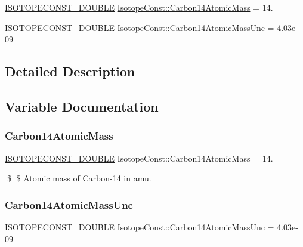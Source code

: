 \begin{DoxyCompactItemize}
\item 
\mbox{\hyperlink{group___isotope_const-_macros_ga8f45a7272ce02c0b4c65c44636ed719a}{I\+S\+O\+T\+O\+P\+E\+C\+O\+N\+S\+T\+\_\+\+D\+O\+U\+B\+LE}} \mbox{\hyperlink{group___isotope_const-_carbon-_c14_ga07f4e550d1315298e91e731909bc37a2}{Isotope\+Const\+::\+Carbon14\+Atomic\+Mass}} = 14.
\item 
\mbox{\hyperlink{group___isotope_const-_macros_ga8f45a7272ce02c0b4c65c44636ed719a}{I\+S\+O\+T\+O\+P\+E\+C\+O\+N\+S\+T\+\_\+\+D\+O\+U\+B\+LE}} \mbox{\hyperlink{group___isotope_const-_carbon-_c14_gacda1a323d85bf263790004e99669d3fc}{Isotope\+Const\+::\+Carbon14\+Atomic\+Mass\+Unc}} = 4.\+03e-\/09
\end{DoxyCompactItemize}


\subsection{Detailed Description}


\subsection{Variable Documentation}
\mbox{\label{group___isotope_const-_carbon-_c14_ga07f4e550d1315298e91e731909bc37a2}} 
\subsubsection{\texorpdfstring{Carbon14\+Atomic\+Mass}{Carbon14AtomicMass}}
{\footnotesize\ttfamily \mbox{\hyperlink{group___isotope_const-_macros_ga8f45a7272ce02c0b4c65c44636ed719a}{I\+S\+O\+T\+O\+P\+E\+C\+O\+N\+S\+T\+\_\+\+D\+O\+U\+B\+LE}} Isotope\+Const\+::\+Carbon14\+Atomic\+Mass = 14.}

\$ \$ Atomic mass of Carbon-\/14 in amu. \mbox{\label{group___isotope_const-_carbon-_c14_gacda1a323d85bf263790004e99669d3fc}} 
\subsubsection{\texorpdfstring{Carbon14\+Atomic\+Mass\+Unc}{Carbon14AtomicMassUnc}}
{\footnotesize\ttfamily \mbox{\hyperlink{group___isotope_const-_macros_ga8f45a7272ce02c0b4c65c44636ed719a}{I\+S\+O\+T\+O\+P\+E\+C\+O\+N\+S\+T\+\_\+\+D\+O\+U\+B\+LE}} Isotope\+Const\+::\+Carbon14\+Atomic\+Mass\+Unc = 4.\+03e-\/09}

